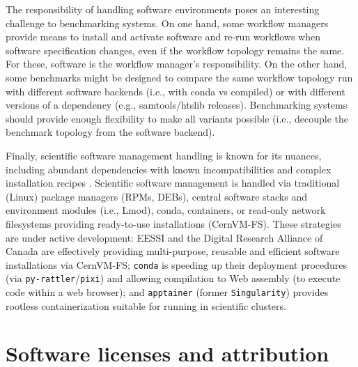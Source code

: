 \documentclass[11pt]{article}
\begin{document}
The responsibility of handling software environments poses an interesting challenge to benchmarking systems. On one hand, some workflow managers provide means to install and activate software and re-run workflows when software specification changes, even if the workflow topology remains the same. For these, software is the workflow manager's responsibility. On the other hand, some benchmarks might be designed to compare the same workflow topology run with different software backends (i.e., with conda vs compiled) or with different versions of a dependency (e.g., samtools/htslib releases). Benchmarking systems should provide enough flexibility to make all variants possible (i.e., decouple the benchmark topology from the software backend).

Finally, scientific software management handling is known for its nuances, including abundant dependencies with known incompatibilities and complex installation recipes \cite{droge2023-ax}. Scientific software management is handled via traditional (Linux) package managers (RPMs, DEBs), central software stacks and environment modules (i.e., Lmod), conda, containers, or read-only network filesystems providing ready-to-use installations (CernVM-FS). These strategies are under active development: EESSI \cite{droge2023-ax} and the Digital Research Alliance of Canada \cite{Boissonneault2019-wm} are effectively providing multi-purpose, reusable and efficient software installations via CernVM-FS; \texttt{conda} is speeding up their deployment procedures (via \texttt{py-rattler}/\texttt{pixi}) and allowing compilation to Web assembly (to execute code within a web browser); and \texttt{apptainer} (former \texttt{Singularity}) provides rootless containerization suitable for running in scientific clusters. 



\section*{Software licenses and attribution}
\end{document}
